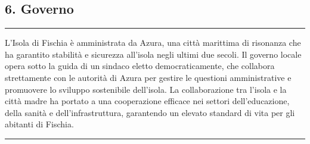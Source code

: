 \subsection{6. Governo}\label{governo}

\begin{center}\rule{0.5\linewidth}{0.5pt}\end{center}

L'Isola di Fischia è amministrata da Azura, una città marittima di
risonanza che ha garantito stabilità e sicurezza all'isola negli ultimi
due secoli. Il governo locale opera sotto la guida di un sindaco eletto
democraticamente, che collabora strettamente con le autorità di Azura
per gestire le questioni amministrative e promuovere lo sviluppo
sostenibile dell'isola. La collaborazione tra l'isola e la città madre
ha portato a una cooperazione efficace nei settori dell'educazione,
della sanità e dell'infrastruttura, garantendo un elevato standard di
vita per gli abitanti di Fischia.

\begin{center}\rule{0.5\linewidth}{0.5pt}\end{center}
